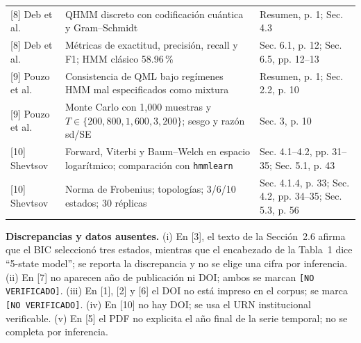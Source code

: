 \documentclass[11pt,a4paper]{article}
\begin{document}
\begin{longtable}{@{}p{1.5cm}p{6.3cm}p{6.4cm}@{}}
{[8]} Deb et al. & QHMM discreto con codificación cuántica y Gram--Schmidt & Resumen, p. 1; Sec. 4.3\\
{[8]} Deb et al. & Métricas de exactitud, precisión, recall y F1; HMM clásico 58.96\,\% & Sec. 6.1, p. 12; Sec. 6.5, pp. 12--13\\
{[9]} Pouzo et al. & Consistencia de QML bajo regímenes HMM mal especificados como mixtura & Resumen, p. 1; Sec. 2.2, p. 10\\
{[9]} Pouzo et al. & Monte Carlo con 1{,}000 muestras y \(T\in\{200,800,1{,}600,3{,}200\}\); sesgo y razón sd/SE & Sec. 3, p. 10\\
{[10]} Shevtsov & Forward, Viterbi y Baum--Welch en espacio logarítmico; comparación con \texttt{hmmlearn} & Sec. 4.1--4.2, pp. 31--35; Sec. 5.1, p. 43\\
{[10]} Shevtsov & Norma de Frobenius; topologías; 3/6/10 estados; 30 réplicas & Sec. 4.1.4, p. 33; Sec. 4.2, pp. 34--35; Sec. 5.3, p. 56\\
\end{longtable}

\textbf{Discrepancias y datos ausentes.} (i) En [3], el texto de la Sección~2.6 afirma que el BIC seleccionó tres estados, mientras que el encabezado de la Tabla~1 dice ``5-state model''; se reporta la discrepancia y no se elige una cifra por inferencia. (ii) En [7] no aparecen año de publicación ni DOI; ambos se marcan \texttt{[NO VERIFICADO]}. (iii) En [1], [2] y [6] el DOI no está impreso en el corpus; se marca \texttt{[NO VERIFICADO]}. (iv) En [10] no hay DOI; se usa el URN institucional verificable. (v) En [5] el PDF no explicita el año final de la serie temporal; no se completa por inferencia.
\end{document}
